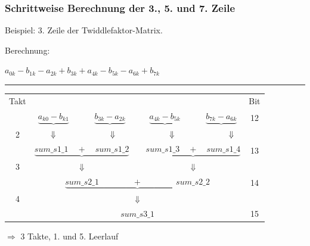 \begin{frame}\frametitle{Schrittweise Berechnung der 3., 5. und 7. Zeile}
Beispiel: 3. Zeile der Twiddlefaktor-Matrix.\\

\vspace{0.5cm}

Berechnung:
\begin{center}
$a_{0k} - b_{1k} - a_{2k} + b_{3k} + a_{4k} - b_{5k} - a_{6k} + b_{7k}$\\
\end{center}
\hrule
\vspace{0.5cm}

\begin{tabular}{ccccccccc}
Takt&\multicolumn{6}{l}{ }& & Bit\\
&$\underbrace{a_{k0} - b_{k1}}$ &  &$ \underbrace{b_{3k} - a_{2k}}$ &  &$\underbrace{a_{4k} - b_{5k}}$ &  &$\underbrace{b_{7k} - a_{6k}}$ & 12\\
2&\multicolumn{7}{l}{$\hspace{0.65cm} \Downarrow \hspace{2.3cm} \Downarrow \hspace{2.3cm} \Downarrow \hspace{2.3cm}\Downarrow$}&\\
&\multicolumn{3}{c}{$\underbrace{sum\_s1\_1 \quad + \quad sum\_s1\_2}$} & & \multicolumn{3}{c}{$\underbrace{sum\_s1\_3 \quad + \quad sum\_s1\_4}$}&13\\
3&\multicolumn{3}{c}{$\Downarrow$} & & \multicolumn{3}{c}{$\Downarrow$}&\\
&\multicolumn{7}{c}{$\underbrace{sum\_s2\_1 \quad  \quad \quad \quad + \quad \quad \quad  \quad sum\_s2\_2}$}&14\\
4&\multicolumn{7}{c}{$\Downarrow$}&\\
&\multicolumn{7}{c}{$sum\_s3\_1$}&15\\
\end{tabular}

\vspace{0.5cm}

$\Rightarrow$ 3 Takte, 1. und 5. Leerlauf\\

\end{frame}

